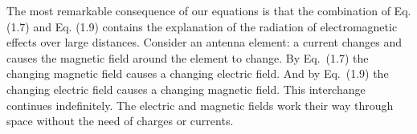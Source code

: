 The most remarkable consequence of our equations is that 
the combination of Eq. (1.7) and Eq. (1.9) contains the explanation of
the radiation of electromagnetic effects over large distances.
Consider an antenna element: a current changes and
causes the magnetic field around the element to change.
By \mbox{Eq. (1.7)} the changing magnetic field causes a changing electric field.
And by \mbox{Eq. (1.9)} the changing electric field causes a changing magnetic field.
This interchange continues indefinitely.
The electric and magnetic fields work their way through space
without the need of charges or currents.


\begin{comment}

We can verify that equations (1.6), (1.7), and (1.9) produce the correct units.
In equation (1.6), the ``net charge inside'' is in coulombs.
The constant $e_0$ is defined in equation (4.10).
It's value is approximately $8.854 \times 10^{-12}$ coul$^2$/nt$\cdot$mt$^2$.
One of the coul terms cancels in the division, and the result is the units for electric flux.
\begin{equation*}
  \frac{coul}{\left( \frac{coul^2}{nt \cdot mt^2} \right)}
  = \frac{nt \cdot mt^2}{coul}
  \equiv \mathrm{Electric\ flux}
\end{equation*}

In equation (1.7), the time derivative of the units for magnetic flux
has the effect of dividing by seconds.
The result is the units for electric circulation.
\begin{equation*}
  \frac{d}{dt} \left( \frac{nt \cdot mt \cdot sec}{coul} \right)
  = \frac{nt \cdot mt}{coul}
  \equiv \mathrm{Electric\ circ.}
\end{equation*}

In equation (1.9), we use only the first term, and then we divide both sides by $c^2$.
The time derivative of the units for electric flux has the effect of dividing by seconds.
The two mt$^2$ terms cancel each other in the division.
One of the sec terms also cancels.
The result is the units for magnetic circulation.
\begin{equation*}
  \frac{\frac{d}{dt} \left(\frac{nt \cdot mt^2}{coul} \right)}
  {\frac{mt^2}{sec^2}} =
  \frac{\frac{nt \cdot mt^2}{coul \cdot sec}}
  {\frac{mt^2}{sec^2}} =
  \frac{nt \cdot sec}{coul}
  \equiv \mathrm{Magnetic\ circ.}
\end{equation*}

\end{comment}

